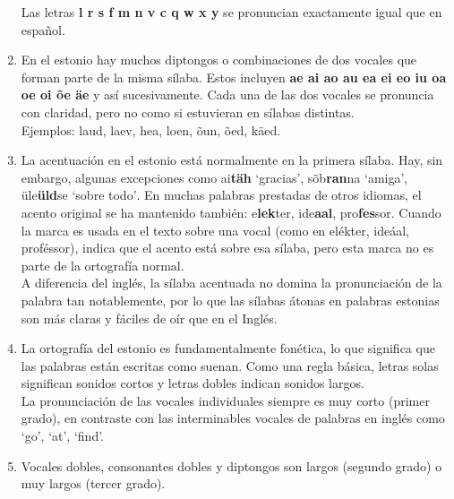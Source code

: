 \begin{enumerate}
\begin{tabular}{ r p{9cm} }
 	\end{tabular}

 	Las letras \textbf{l r s f m n v c q w x y} se pronuncian exactamente igual que en español.\\

 	\item En el estonio hay muchos diptongos o combinaciones de dos vocales que forman parte de la misma sílaba. Estos incluyen \foreignlanguage{estonian}{\textbf{ae ai ao au ea ei eo iu oa oe oi õe äe}} y así sucesivamente. Cada una de las dos vocales se pronuncia con claridad, pero no como si estuvieran en sílabas distintas.\\

 	Ejemplos: \foreignlanguage{estonian}{laud, laev, hea, loen, õun, õed, käed}.\\

 	\item La acentuación en el estonio está normalmente en la primera sílaba. Hay, sin embargo, algunas excepciones como \foreignlanguage{estonian}{ai\textbf{täh} `gracias', sõb\textbf{ran}na `amiga', üle\textbf{üld}se `sobre todo'}. En muchas palabras prestadas de otros idiomas, el acento original se ha mantenido también: \foreignlanguage{estonian}{e\textbf{lek}ter, ide\textbf{aal}, pro\textbf{fes}sor}. Cuando la marca \textasciiacute es usada en el texto sobre una vocal (como en elékter, ideáal, proféssor), indica que el acento está sobre esa sílaba, pero esta marca no es parte de la ortografía normal.\\

 	A diferencia del inglés, la sílaba acentuada no domina la pronunciación de la palabra tan notablemente, por lo que las sílabas átonas en palabras estonias son más claras y fáciles de oír que en el Inglés.\\

 	\item La ortografía del estonio es fundamentalmente fonética, lo que significa que las palabras están escritas como suenan. Como una regla básica, letras solas significan sonidos cortos y letras dobles indican sonidos largos.\\

 	La pronunciación de las vocales individuales siempre es muy corto (primer grado), en contraste con las interminables vocales de palabras en inglés como `go', `at', `find'.\\

 	\item Vocales dobles, consonantes dobles y diptongos son largos (segundo grado) o muy largos (tercer grado).\\


\end{enumerate}
